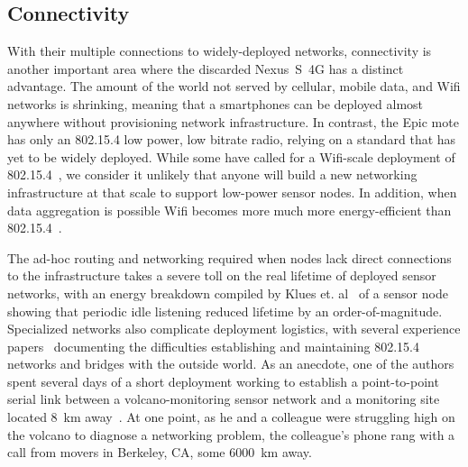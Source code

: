 \subsection{Connectivity}

With their multiple connections to widely-deployed networks, connectivity is
another important area where the discarded Nexus~S~4G has a distinct
advantage. The amount of the world not served by cellular, mobile data, and
Wifi networks is shrinking, meaning that a smartphones can be deployed almost
anywhere without provisioning network infrastructure. In contrast, the Epic
mote has only an 802.15.4 low power, low bitrate radio, relying on a standard
that has yet to be widely deployed. While some have called for a Wifi-scale
deployment of 802.15.4~\cite{leaves-ipsn12}, we consider it unlikely that
anyone will build a new networking infrastructure at that scale to support
low-power sensor nodes. In addition, when data aggregation is possible Wifi
becomes more much more energy-efficient than
802.15.4~\cite{wirelessenergyconsumption-url}.

The ad-hoc routing and networking required when nodes lack direct connections
to the infrastructure takes a severe toll on the real lifetime of deployed
sensor networks, with an energy breakdown compiled by Klues et.
al~\cite{icem-sosp07} of a sensor node showing that periodic idle listening
reduced lifetime by an order-of-magnitude. Specialized networks also
complicate deployment logistics, with several experience
papers~\cite{volcano-osdi06,hitchhikers-sensys08} documenting the
difficulties establishing and maintaining 802.15.4 networks and bridges with
the outside world. As an anecdote, one of the authors spent several days of a
short deployment working to establish a point-to-point serial link between a
volcano-monitoring sensor network and a monitoring site located 8~km
away~\cite{lance-sensys08}. At one point, as he and a colleague were
struggling high on the volcano to diagnose a networking problem, the
colleague's phone rang with a call from movers in Berkeley, CA, some
\num{6000}~km away.

\begin{comment}


While attempting to save energy, smartphones can also harness the powered
nature of the wireless infrastructure they utilize. Wifi Power Saving Mode
(PSM), for example, allows high-power routers to buffer incoming packets to
allow low-power clients to save energy. Cellular networks also buffer data,
such as text messages, for clients, and here the buffering timeouts are much
longer. A sensor network built from discarded smartphones that wanted to take
a Koala-like~\cite{koala-ipsn08} approach to providing pull-based data
collection could use text messages to awake the network. Discarded phones
could be aggressively duty-cycled, relying on the willingness of the
networking infrastructure to hold incoming messages across long sleep
intervals.

\end{comment}

